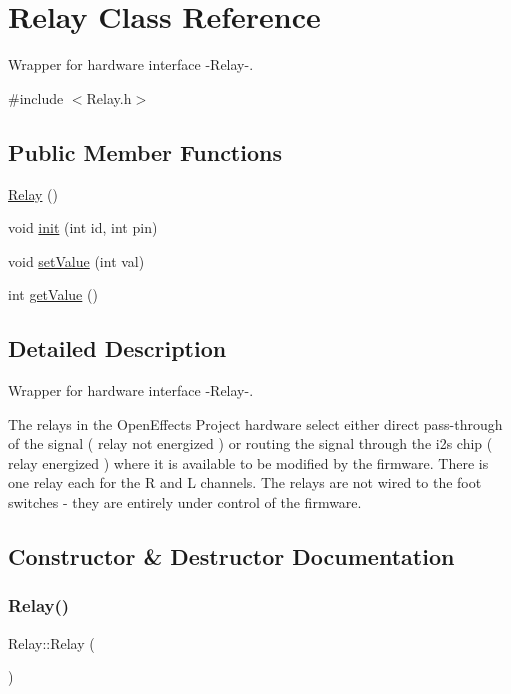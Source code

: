 \hypertarget{class_relay}{}\section{Relay Class Reference}
\label{class_relay}


Wrapper for hardware interface -\/\+Relay-\/.  




{\ttfamily \#include $<$Relay.\+h$>$}

\subsection*{Public Member Functions}
\begin{DoxyCompactItemize}
\item 
\mbox{\hyperlink{class_relay_a8c3f19e1e845315418003cd41d2a6a87}{Relay}} ()
\item 
void \mbox{\hyperlink{class_relay_af8403e742823980f606c09e9508cbf07}{init}} (int id, int pin)
\item 
void \mbox{\hyperlink{class_relay_ad503697efacdaeb980a9e580a3ae8def}{set\+Value}} (int val)
\item 
int \mbox{\hyperlink{class_relay_a79282f246d1314dbd8d1935dbe7dfe44}{get\+Value}} ()
\end{DoxyCompactItemize}


\subsection{Detailed Description}
Wrapper for hardware interface -\/\+Relay-\/. 

The relays in the Open\+Effects Project hardware select either direct pass-\/through of the signal ( relay not energized ) or routing the signal through the i2s chip ( relay energized ) where it is available to be modified by the firmware. There is one relay each for the R and L channels. The relays are not wired to the foot switches -\/ they are entirely under control of the firmware. 

\subsection{Constructor \& Destructor Documentation}
\mbox{\label{class_relay_a8c3f19e1e845315418003cd41d2a6a87}} 
\subsubsection{\texorpdfstring{Relay()}{Relay()}}
{\footnotesize\ttfamily Relay\+::\+Relay (\begin{DoxyParamCaption}{ }\end{DoxyParamCaption})}



